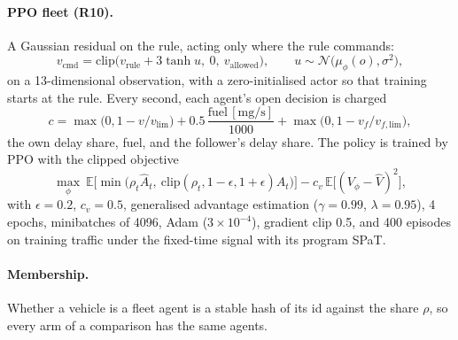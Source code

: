 \documentclass[11pt]{article}
\begin{document}
\paragraph{PPO fleet (R10).} A Gaussian residual on the rule, acting only where the rule commands:
\begin{equation}
v_{\mathrm{cmd}}=\mathrm{clip}\big(v_{\mathrm{rule}}+3\tanh u,\ 0,\ v_{\mathrm{allowed}}\big),\qquad u\sim\mathcal N\big(\mu_\phi(o),\sigma^2\big),
\end{equation}
on a 13-dimensional observation, with a zero-initialised actor so that training starts at the rule. Every second, each agent's open
decision is charged
\begin{equation}
c=\max\big(0,1-v/v_{\mathrm{lim}}\big)+0.5\,\frac{\text{fuel}\,[\mathrm{mg/s}]}{1000}+\max\big(0,1-v_f/v_{f,\mathrm{lim}}\big),
\end{equation}
the own delay share, fuel, and the follower's delay share. The policy is trained by PPO with the clipped objective
\begin{equation}
\max_\phi\ \mathbb E\Big[\min\big(\rho_t\hat A_t,\ \mathrm{clip}(\rho_t,1-\epsilon,1+\epsilon)\hat A_t\big)\Big]-c_v\,\mathbb E\big[(V_\phi-\hat V)^2\big],
\end{equation}
with $\epsilon=0.2$, $c_v=0.5$, generalised advantage estimation ($\gamma=0.99$, $\lambda=0.95$), 4 epochs, minibatches of 4096, Adam
($3\times10^{-4}$), gradient clip 0.5, and 400 episodes on training traffic under the fixed-time signal with its program SPaT.
\paragraph{Membership.} Whether a vehicle is a fleet agent is a stable hash of its id against the share $\rho$, so every arm of a
comparison has the same agents.
\end{document}
